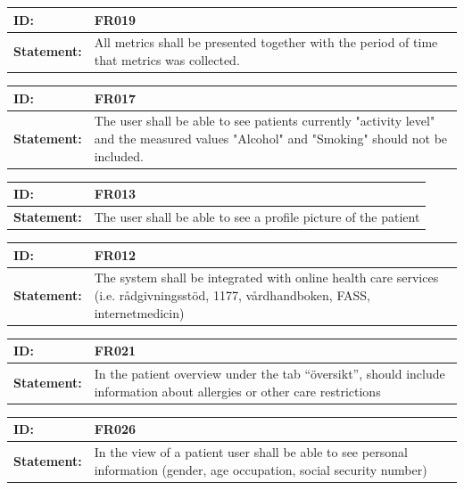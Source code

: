 \documentclass{scrreprt}
\begin{document}
\begin{center}
\begin{tabularx}{\linewidth}{| l | X |}
 \hline
 \textbf{ID:} & FR019  \\ 
 \hline
 \textbf{Statement:} & All metrics shall be presented together with the period of time that metrics was collected. 
 \\ 
 \hline
\end{tabularx}

\begin{tabularx}{\linewidth}{| l | X |}
 \hline
 \textbf{ID:} & FR017  \\ 
 \hline
 \textbf{Statement:} & The user shall be able to see patients currently "activity level" and the measured values "Alcohol" and "Smoking" should not be included.
 \\ 
 \hline
\end{tabularx}

\begin{tabularx}{\linewidth}{| l | X |}
 \hline
 \textbf{ID:} & FR013  \\ 
 \hline
 \textbf{Statement:} & The user shall be able to see a profile picture of the patient
 \\ 
 \hline
\end{tabularx}

\begin{tabularx}{\linewidth}{| l | X |}
 \hline
 \textbf{ID:} & FR012  \\ 
 \hline
 \textbf{Statement:} & The system shall be integrated with online health care services (i.e. rådgivningsstöd, 1177, vårdhandboken, FASS, internetmedicin) \\ 
 \hline
\end{tabularx}

\begin{tabularx}{\linewidth}{| l | X |}
 \hline
 \textbf{ID:} & FR021  \\ 
 \hline
 \textbf{Statement:} & In the patient overview under the tab “översikt”, should include information about allergies or other care restrictions
 \\ 
 \hline
\end{tabularx}

\begin{tabularx}{\linewidth}{| l | X |}
 \hline
 \textbf{ID:} & FR026  \\ 
 \hline
 \textbf{Statement:} & In the view of a patient user shall be able to see personal information (gender, age occupation, social security number) 
 \\ 
 \hline
\end{tabularx}


\end{center}
\end{document}
